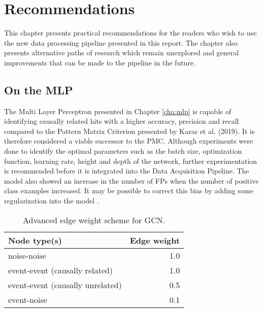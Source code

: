 
\chapter{Recommendations} %
\label{cha:rec}

%

This chapter presents practical recommendations for the readers who
wish to use the new data processing pipeline presented in this report.
The chapter also presents alternative paths of research which remain
unexplored and general improvements that can be made to the pipeline
in the future.

\section{On the MLP}
The Multi Layer Perceptron presented in Chapter \ref{cha:mlp} is
capable of identifying causally related hits with a higher accuracy,
precision and recall compared to the Pattern Matrix Criterion
presented by Karas et al. (2019). It is therefore considered a viable
successor to the PMC. Although experiments were done to identify the
optimal parameters such as the batch size, optimization function,
learning rate, height and depth of the network, further
experimentation is recommended before it is integrated into the Data
Acquisition Pipeline. The model also showed an increase in the number
of FPs when the number of positive class examples increased. It may be
possible to correct this bias by adding some regularization into the
model \cite{goodfellow2016deep}.

\begin{table}[htb]
  \centering
  \caption{Advanced edge weight scheme for GCN.}
  \begin{tabular}{lr}
    \hline
    Node type(s) & Edge weight \\
    \hline
    noise-noise & 1.0 \\
    event-event (causally related) & 1.0 \\
    event-event (causally unrelated) & 0.5 \\
    event-noise & 0.1 \\
    \hline
  \end{tabular}
  \label{tab:gcn-adv-weights}
\end{table}


